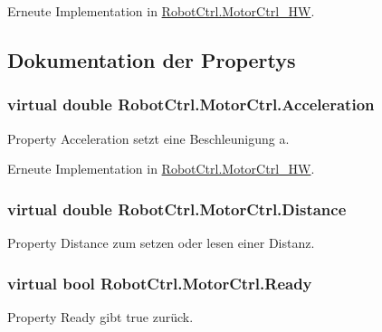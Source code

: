 Erneute Implementation in \hyperlink{class_robot_ctrl_1_1_motor_ctrl___h_w_ad7a992614ff75966b4381f8f8ef56cfd}{RobotCtrl.MotorCtrl\_\-HW}.



\subsection{Dokumentation der Propertys}
\hypertarget{class_robot_ctrl_1_1_motor_ctrl_a57bbec274a01f59d5e5ede7599e0ca9f}{
\subsubsection[{Acceleration}]{\setlength{\rightskip}{0pt plus 5cm}virtual double RobotCtrl.MotorCtrl.Acceleration}}
\label{class_robot_ctrl_1_1_motor_ctrl_a57bbec274a01f59d5e5ede7599e0ca9f}
Property Acceleration setzt eine Beschleunigung a. 

Erneute Implementation in \hyperlink{class_robot_ctrl_1_1_motor_ctrl___h_w_aeee6ccb14bb1c24c2541c64c0ad91c0e}{RobotCtrl.MotorCtrl\_\-HW}.

\hypertarget{class_robot_ctrl_1_1_motor_ctrl_a7f1b09f359e4e09c85c9438a5de7dd9b}{
\subsubsection[{Distance}]{\setlength{\rightskip}{0pt plus 5cm}virtual double RobotCtrl.MotorCtrl.Distance}}
\label{class_robot_ctrl_1_1_motor_ctrl_a7f1b09f359e4e09c85c9438a5de7dd9b}
Property Distance zum setzen oder lesen einer Distanz. \hypertarget{class_robot_ctrl_1_1_motor_ctrl_a1152904081a4c96fa0bf27a6a48e728d}{
\subsubsection[{Ready}]{\setlength{\rightskip}{0pt plus 5cm}virtual bool RobotCtrl.MotorCtrl.Ready}}
\label{class_robot_ctrl_1_1_motor_ctrl_a1152904081a4c96fa0bf27a6a48e728d}
Property Ready gibt true zur\"{u}ck. 

